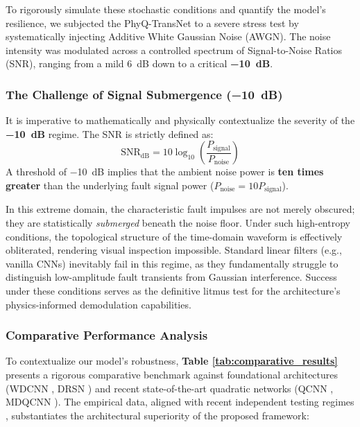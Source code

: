 \documentclass[5p,times,twocolumn]{elsarticle}
\begin{document}
To rigorously simulate these stochastic conditions and quantify the model's resilience, we subjected the PhyQ-TransNet to a severe stress test by systematically injecting Additive White Gaussian Noise (AWGN). The noise intensity was modulated across a controlled spectrum of Signal-to-Noise Ratios (SNR), ranging from a mild \SI{+6}{dB} down to a critical \textbf{\SI{-10}{dB}}.

\subsubsection{The Challenge of Signal Submergence (\SI{-10}{dB})}
It is imperative to mathematically and physically contextualize the severity of the \textbf{\SI{-10}{dB}} regime. The SNR is strictly defined as:
\begin{equation}
    \text{SNR}_{\text{dB}} = 10 \log_{10}\left(\frac{P_{\text{signal}}}{P_{\text{noise}}}\right)
\end{equation}
A threshold of \SI{-10}{dB} implies that the ambient noise power is \textbf{ten times greater} than the underlying fault signal power ($P_{\text{noise}} = 10 P_{\text{signal}}$). 

In this extreme domain, the characteristic fault impulses are not merely obscured; they are statistically \textit{submerged} beneath the noise floor. Under such high-entropy conditions, the topological structure of the time-domain waveform is effectively obliterated, rendering visual inspection impossible. Standard linear filters (e.g., vanilla CNNs) inevitably fail in this regime, as they fundamentally struggle to distinguish low-amplitude fault transients from Gaussian interference. Success under these conditions serves as the definitive litmus test for the architecture's physics-informed demodulation capabilities.

\subsubsection{Comparative Performance Analysis}
To contextualize our model's robustness, \textbf{Table \ref{tab:comparative_results}} presents a rigorous comparative benchmark against foundational architectures (WDCNN \cite{P21_Zhang}, DRSN \cite{P20_Zhao}) and recent state-of-the-art quadratic networks (QCNN \cite{Ref_Liao_QCNN}, MDQCNN \cite{Ref_Ji_MDQCNN}). The empirical data, aligned with recent independent testing regimes \cite{Ref_Ji_MDQCNN}, substantiates the architectural superiority of the proposed framework:
\end{document}
